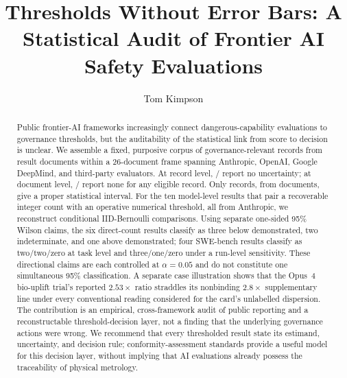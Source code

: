 \documentclass{article}
\title{Thresholds Without Error Bars: A Statistical Audit of Frontier AI Safety Evaluations}
\author[1]{Tom Kimpson}
\affil[1]{School of Mathematics and Statistics, The University of Melbourne, Parkville, VIC 3010, Australia\\
Correspondence: \texttt{tom.kimpson@unimelb.edu.au}}
\begin{document}
\maketitle


\begin{abstract}

Public frontier-AI frameworks increasingly connect dangerous-capability evaluations to
governance thresholds, but the auditability of the statistical link from score to decision
is unclear. We assemble a fixed, purposive corpus of \CensusTotal{}
governance-relevant records from \CensusSourceDocs{} result documents within a
26-document frame spanning Anthropic, OpenAI, Google DeepMind, and third-party evaluators.
At record level, \CensusNoUncertainty{}/\CensusTotal{} report no uncertainty; at document
level, \CensusSourceNoUncertainty{}/\CensusSourceDocs{} report none for any eligible
record. Only \CensusInterval{} records, from \CensusSourceInterval{} documents, give a
proper statistical interval. For the ten model-level results that pair a recoverable
integer count with an operative numerical threshold, all from Anthropic, we reconstruct
conditional IID-Bernoulli comparisons. Using separate one-sided 95\% Wilson claims, the six
direct-count results classify as three below demonstrated, two indeterminate, and one above
demonstrated; four SWE-bench results classify as two/two/zero at task level and
three/one/zero under a run-level sensitivity. These directional claims are each controlled
at $\alpha=0.05$ and do not constitute one simultaneous 95\% classification. A separate
case illustration shows that the Opus~4 bio-uplift trial's reported $2.53\times$ ratio
straddles its nonbinding $2.8\times$ supplementary line under every conventional reading
considered for the card's unlabelled dispersion. The contribution is an empirical,
cross-framework audit of public reporting and a reconstructable threshold-decision layer,
not a finding that the underlying governance actions were wrong. We recommend that every
thresholded result state its estimand, uncertainty, and decision rule; conformity-assessment
standards provide a useful model for this decision layer, without implying that AI
evaluations already possess the traceability of physical metrology.
\end{abstract}


\end{document}
